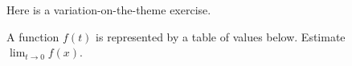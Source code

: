 \documentclass[../main.tex]{subfiles}
\begin{document}



Here is a variation-on-the-theme exercise.
\begin{example}
  A function \(f(t)\) is represented by a table of values below. Estimate \(\lim_{t \to 0} f(x)\).

  \hspace{2in} 
\end{example}
\end{document}
